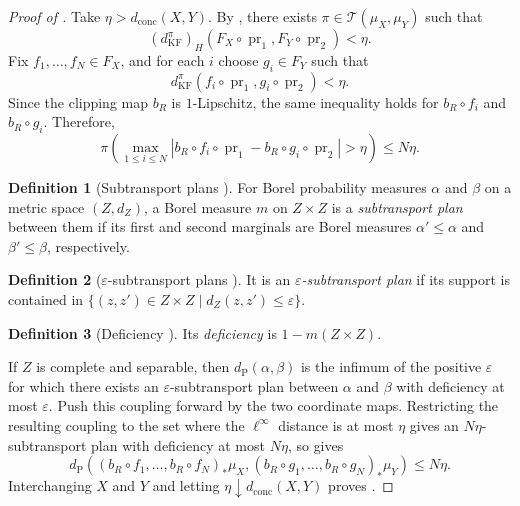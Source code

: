 \documentclass{amsart}
\theoremstyle{plain}
\theoremstyle{definition}
\newtheorem*{definition*}{Definition}
\theoremstyle{remark}
\DeclareMathOperator{\pr}{pr}
\newcommand{\dconc}{d_{\operatorname{conc}}}
\newcommand{\dpr}{d_{\operatorname{P}}}
\newcommand{\kf}{d_{\operatorname{KF}}}
\newcommand{\haus}[1]{\left(#1\right)_H}
\newcommand{\Tplan}{\mathcal{T}}
\begin{document}
\begin{proof}[Proof of ]
Take $\eta>\dconc(X,Y)$. By , there exists $\pi\in\Tplan(\mu_X,\mu_Y)$ such that
\[\haus{\kf^\pi}(F_X\circ\pr_1,F_Y\circ\pr_2)<\eta.\]
Fix $f_1,\ldots,f_N\in F_X$, and for each $i$ choose $g_i\in F_Y$ such that
\[\kf^\pi(f_i\circ\pr_1,g_i\circ\pr_2)<\eta.\]
Since the clipping map $b_R$ is $1$-Lipschitz, the same inequality holds for $b_R\circ f_i$ and $b_R\circ g_i$. Therefore,
\[\pi\left(\max_{1\leq i\leq N}|b_R\circ f_i\circ\pr_1-b_R\circ g_i\circ\pr_2|>\eta\right)\leq N\eta.\]
\begin{definition*}[Subtransport plans {\cite[Theorem~1.22]{shioya2016mmg}}]
For Borel probability measures $\alpha$ and $\beta$ on a metric space $(Z,d_Z)$, a Borel measure $m$ on $Z\times Z$ is a \emph{subtransport plan} between them if its first and second marginals are Borel measures $\alpha'\leq\alpha$ and $\beta'\leq\beta$, respectively.
\end{definition*}

\begin{definition*}[$\varepsilon$-subtransport plans {\cite[Theorem~1.22]{shioya2016mmg}}]
It is an \emph{$\varepsilon$-subtransport plan} if its support is contained in $\{(z,z')\in Z\times Z\mid d_Z(z,z')\leq\varepsilon\}$.
\end{definition*}

\begin{definition*}[Deficiency {\cite[Theorem~1.22]{shioya2016mmg}}]
Its \emph{deficiency} is $1-m(Z\times Z)$.
\end{definition*}
If $Z$ is complete and separable, then $\dpr(\alpha,\beta)$ is the infimum of the positive $\varepsilon$ for which there exists an $\varepsilon$-subtransport plan between $\alpha$ and $\beta$ with deficiency at most $\varepsilon$.
Push this coupling forward by the two coordinate maps. Restricting the resulting coupling to the set where the $\ell^\infty$ distance is at most $\eta$ gives an $N\eta$-subtransport plan with deficiency at most $N\eta$, so \cite[Theorem~1.22]{shioya2016mmg} gives
\[\dpr((b_R\circ f_1,\ldots,b_R\circ f_N)_*\mu_X,(b_R\circ g_1,\ldots,b_R\circ g_N)_*\mu_Y)\leq N\eta.\]
Interchanging $X$ and $Y$ and letting $\eta\downarrow\dconc(X,Y)$ proves .


\end{proof}
\end{document}
